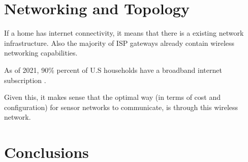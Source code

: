 \documentclass[journal]{IEEEtran} %
\begin{document}




\section{Networking and Topology}

If a home has internet connectivity, it means that there is a existing network infrastructure.
Also the majority of ISP gateways already contain wireless networking capabilities.

As of 2021, 90\% percent of U.S households have a broadband internet subscription \cite{censusgov}.

Given this, it makes sense that the optimal way (in terms of cost and configuration) for sensor networks to communicate,
is through this wireless network.


\section{Conclusions}



\end{document}
